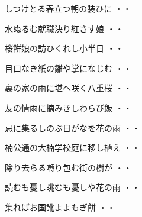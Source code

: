 \begin{shiika}しつけとる春立つ朝の装ひに
\hfill{・・}\end{shiika}
\vspace{0.6cm}
\begin{shiika}水ぬるむ就職決り紅さす娘
\hfill{・・}\end{shiika}
\vspace{0.6cm}
\begin{shiika}桜餅娘の訪ひくれし小半日
\hfill{・・}\end{shiika}
\vspace{0.6cm}
\begin{shiika}目口なき紙の雛や掌になじむ
\hfill{・・}\end{shiika}
\vspace{0.6cm}
\begin{shiika}裏の家の雨に堪へ咲く八重桜
\hfill{・・}\end{shiika}
\vspace{0.6cm}
\begin{shiika}友の情雨に摘みきしわらび飯
\hfill{・・}\end{shiika}
\vspace{0.6cm}
\begin{shiika}忌に集るしのぶ日がなを花の雨
\hfill{・・}\end{shiika}
\vspace{0.6cm}
\begin{shiika}楠公通の大楠学校庭に移し植え
\hfill{・・}\end{shiika}
\vspace{0.6cm}
\begin{shiika}除り去らる囀り包む街の樹が
\hfill{・・}\end{shiika}
\vspace{0.6cm}
\begin{shiika}読むも憂し眺むも憂しや花の雨
\hfill{・・}\end{shiika}
\vspace{0.6cm}
\begin{shiika}集ればお国訛よよもぎ餅
\hfill{・・}\end{shiika}
\vspace{0.6cm}
